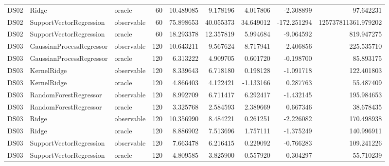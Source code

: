 \begin{tabular}{lllrrrrrr}
DS02 & Ridge & oracle & 60 & 10.489085 & 9.178196 & 4.017806 & -2.308899 & 97.642231 \\
DS02 & SupportVectorRegression & observable & 60 & 75.898653 & 40.055373 & 34.649012 & -172.251294 & 125737811361.979202 \\
DS02 & SupportVectorRegression & oracle & 60 & 18.293378 & 12.357819 & 5.994684 & -9.064592 & 819.947275 \\
DS03 & GaussianProcessRegressor & observable & 120 & 10.643211 & 9.567624 & 8.717941 & -2.406856 & 225.535710 \\
DS03 & GaussianProcessRegressor & oracle & 120 & 6.313222 & 4.909705 & 0.601720 & -0.198700 & 85.893175 \\
DS03 & KernelRidge & observable & 120 & 8.339643 & 6.718180 & 0.198128 & -1.091718 & 122.401803 \\
DS03 & KernelRidge & oracle & 120 & 4.866403 & 4.122421 & -1.133166 & 0.287763 & 55.487409 \\
DS03 & RandomForestRegressor & observable & 120 & 8.992709 & 6.711417 & 6.292417 & -1.432145 & 195.984653 \\
DS03 & RandomForestRegressor & oracle & 120 & 3.325768 & 2.584593 & 2.389669 & 0.667346 & 38.678435 \\
DS03 & Ridge & observable & 120 & 10.356990 & 8.484221 & 0.261251 & -2.226082 & 170.498938 \\
DS03 & Ridge & oracle & 120 & 8.886902 & 7.513696 & 1.757111 & -1.375249 & 140.996911 \\
DS03 & SupportVectorRegression & observable & 120 & 7.663478 & 6.216415 & 0.229092 & -0.766283 & 109.241226 \\
DS03 & SupportVectorRegression & oracle & 120 & 4.809585 & 3.825900 & -0.557920 & 0.304297 & 55.710239 \\
\bottomrule
\end{tabular}
